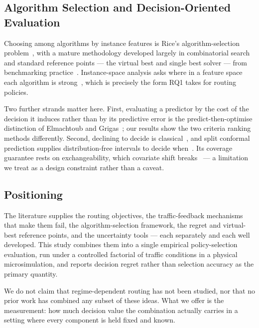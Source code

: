 \subsection{Algorithm Selection and Decision-Oriented Evaluation}

Choosing among algorithms by instance features is Rice's algorithm-selection
problem~\cite{rice1976}, with a mature methodology developed largely in
combinatorial search~\cite{xu2008satzilla,smithmiles2009,kotthoff2014survey}
and standard reference points --- the virtual best and single best solver ---
from benchmarking practice~\cite{bischl2016aslib}. Instance-space analysis asks
where in a feature space each algorithm is strong~\cite{smithmiles2014instance},
which is precisely the form RQ1 takes for routing policies.

Two further strands matter here. First, evaluating a predictor by the cost of
the decision it induces rather than by its predictive error is the
predict-then-optimise distinction of Elmachtoub and
Grigas~\cite{elmachtoub2022spo}; our results show the two criteria ranking
methods differently. Second, declining to decide is
classical~\cite{chow1970reject}, and split conformal prediction supplies
distribution-free intervals to decide when~\cite{vovk2005alrw,lei2018conformal}.
Its coverage guarantee rests on exchangeability, which covariate shift
breaks~\cite{shimodaira2000,tibshirani2019covshift} --- a limitation we treat
as a design constraint rather than a caveat.

\subsection{Positioning}
\label{sec:positioning}

The literature supplies the routing objectives, the traffic-feedback mechanisms
that make them fail, the algorithm-selection framework, the regret and
virtual-best reference points, and the uncertainty tools --- each separately and
each well developed. This study combines them into a single empirical
policy-selection evaluation, run under a controlled factorial of traffic
conditions in a physical microsimulation, and reports decision regret rather
than selection accuracy as the primary quantity.

We do not claim that regime-dependent routing has not been studied, nor that no
prior work has combined any subset of these ideas. What we offer is the
measurement: how much decision value the combination actually carries in a
setting where every component is held fixed and known.
